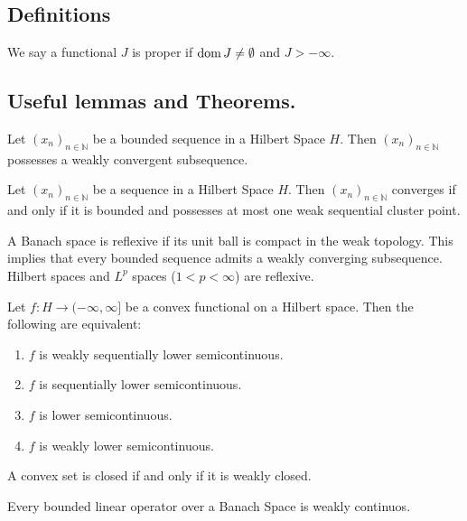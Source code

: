 \subsection{Definitions}
\begin{definition}
	We say a functional $J$ is proper if $\mathrm{dom\,} J \neq \emptyset$ and $J>-\infty$.
\end{definition}
\subsection{Useful lemmas and Theorems.}
\begin{lemma}
	Let $(x_n)_{n \in \mathbb{N}}$ be a bounded sequence in a Hilbert Space $H$. Then $(x_n)_{n \in \mathbb{N}}$ possesses a weakly convergent subsequence.
\end{lemma}

\begin{lemma}
Let $(x_n)_{n \in \mathbb{N}}$ be a sequence in a Hilbert Space $H$. Then $(x_n)_{n \in \mathbb{N}}$ converges if and only if it is bounded and possesses at most one weak sequential cluster point.
\end{lemma}
\begin{fact}
	A Banach space is reflexive if its unit ball is compact in the weak topology. This implies that every bounded sequence admits a weakly converging subsequence. Hilbert spaces and $L^p$ spaces ($1<p<\infty$) are reflexive.
\end{fact}
\begin{theorem} 
	Let $f: H \rightarrow (−\infty, \infty]$ be a convex functional on a Hilbert space. Then the following are equivalent:
	\begin{enumerate}[label=(\roman{*})]
\item 	$f$ is weakly sequentially lower semicontinuous.
\item 	$f$ is sequentially lower semicontinuous.
\item 	$f$ is lower semicontinuous.
\item 	$f$ is weakly lower semicontinuous.
	\end{enumerate}
\end{theorem}

\begin{lemma}
	A convex set is closed if and only if it is weakly closed.
\end{lemma}

\begin{lemma}
	Every bounded linear operator over a Banach Space is weakly continuos.
\end{lemma}

